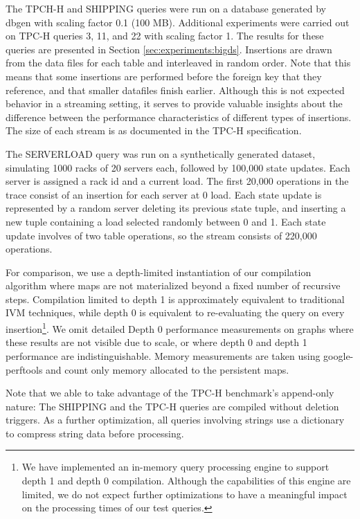 The TPCH-H and SHIPPING queries were run on a database generated by dbgen\cite{tpch} with scaling factor 0.1 (100 MB).  Additional experiments were carried out on TPC-H queries 3, 11, and 22 with scaling factor 1.  The results for these queries are presented in Section \ref{sec:experiments:bigds}.  Insertions are drawn from the data files for each table and interleaved in random order.  Note that this means that some insertions are performed before the foreign key that they reference, and that smaller datafiles finish earlier.  Although this is not expected behavior in a streaming setting, it serves to provide valuable insights about the difference between the performance characteristics of different types of insertions.  The size of each stream is as documented in the TPC-H specification\cite{tpch}.

The SERVERLOAD query was run on a synthetically generated dataset, simulating 1000 racks of 20 servers each, followed by 100,000 state updates.  Each server is assigned a rack id and a current load.  The first 20,000 operations in the trace consist of an insertion for each server at 0 load.  Each state update is represented by a random server deleting its previous state tuple, and inserting a new tuple containing a load selected randomly between 0 and 1.  Each state update involves of two table operations, so the stream consists of 220,000 operations.

For comparison, we use a depth-limited instantiation of our compilation algorithm where maps are not materialized beyond a fixed number of recursive steps.  Compilation limited to depth 1 is approximately equivalent to traditional IVM techniques, while depth 0 is equivalent to re-evaluating the query on every insertion\footnote{We have implemented an in-memory query processing engine to support depth 1 and depth 0 compilation.  Although the capabilities of this engine are limited, we do not expect further optimizations  to have a meaningful impact on the processing times of our test queries.}.  We omit detailed Depth 0 performance measurements on graphs where these results are not visible due to scale, or where depth 0 and depth 1 performance are indistinguishable.  Memory measurements are taken using google-perftools\cite{perftools} and count only memory allocated to the persistent maps.

Note that we able to take advantage of the TPC-H benchmark's append-only nature: The SHIPPING and the TPC-H queries are compiled without deletion triggers.  As a further optimization, all queries involving strings use a dictionary to compress string data before processing.

